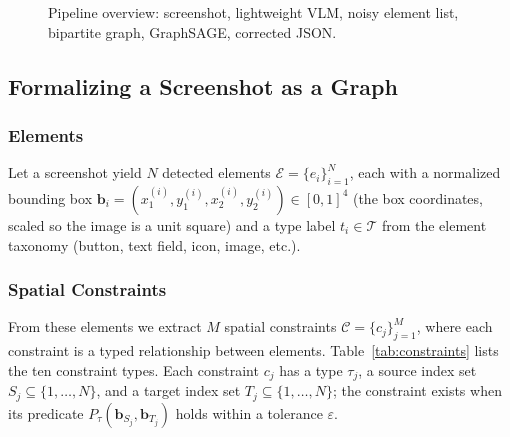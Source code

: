 \documentclass[11pt, letterpaper]{article}
\begin{document}
\begin{figure}[htbp]
\centering
{}
\caption{Pipeline overview: screenshot, lightweight VLM, noisy element
list, bipartite graph, GraphSAGE, corrected JSON.}
\label{fig:pipeline}
\end{figure}

\subsection{Formalizing a Screenshot as a Graph}
\subsubsection{Elements}
\sloppy
Let a screenshot yield $N$ detected elements
$\mathcal{E}=\{e_i\}_{i=1}^{N}$, each with a normalized bounding box
$\mathbf{b}_i=(x_1^{(i)},y_1^{(i)},x_2^{(i)},y_2^{(i)})\in[0,1]^4$ (the box
coordinates, scaled so the image is a unit square) and a type label
$t_i\in\mathcal{T}$ from the element taxonomy (button, text field, icon,
image, etc.).

\subsubsection{Spatial Constraints}
From these elements we extract $M$ spatial constraints
$\mathcal{C}=\{c_j\}_{j=1}^{M}$, where each constraint is a typed relationship
between elements. Table~\ref{tab:constraints} lists the ten constraint types.
Each constraint $c_j$ has a type $\tau_j$, a source index set
$S_j\subseteq\{1,\dots,N\}$, and a target index set
$T_j\subseteq\{1,\dots,N\}$; the constraint exists when its predicate
$P_\tau(\mathbf{b}_{S_j},\mathbf{b}_{T_j})$ holds within a tolerance
$\varepsilon$.
\end{document}

